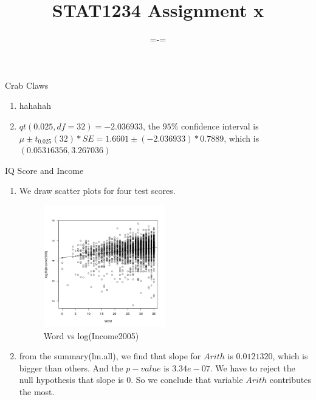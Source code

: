 \documentclass[12pt]{article}
\newenvironment{question}[2][Question]{\begin{trivlist}
\item[\hskip \labelsep {\bfseries #1}\hskip \labelsep {\bfseries #2.}]}{\end{trivlist}}
\begin{document}
 
 
\title{STAT1234 Assignment x}%
\author{=-=\\ %
} %
 
\maketitle

\begin{question}{EX 10.09} %
Crab Claws
\end{question}
\begin{enumerate}
	\item hahahah
	\item $qt(0.025,df=32) = -2.036933$, the $95\%$ confidence interval is $\mu \pm t_{0.025}(32)*SE = 1.6601 \pm (-2.036933)*0.7889$, which is $(0.05316356,3.267036)$
\end{enumerate}



\begin{question}{EX 10.33}
	IQ Score and Income
\end{question}
\begin{enumerate}
	\item We draw scatter plots for four test scores.
	
	\begin{figure}[!ht]
		\label{Word}
		\caption{Word vs log(Income2005)}
		\centering
		\includegraphics[width=0.5\textwidth]{Word}
	\end{figure}
	
	
	\item from the summary(lm.all), we find that slope for $Arith$ is $0.0121320$, which is bigger than others. And the $p-value$ is $3.34e-07$. We have to reject the null hypothesis that slope is $0$. So we conclude that variable $Arith$ contributes the most. 
	
		
\end{enumerate}
\end{document}
